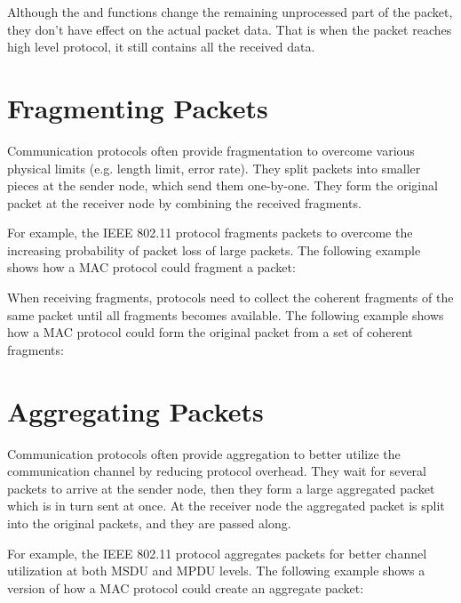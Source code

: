 
Although the  and  functions change the
remaining unprocessed part of the packet, they don't have effect on the actual
packet data. That is when the packet reaches high level protocol, it still
contains all the received data.

\section{Fragmenting Packets}

Communication protocols often provide fragmentation to overcome various physical
limits (e.g. length limit, error rate). They split packets into smaller pieces
at the sender node, which send them one-by-one. They form the original packet at
the receiver node by combining the received fragments.

For example, the IEEE 802.11 protocol fragments packets to overcome the
increasing probability of packet loss of large packets. The following example
shows how a MAC protocol could fragment a packet:


When receiving fragments, protocols need to collect the coherent fragments of
the same packet until all fragments becomes available. The following example
shows how a MAC protocol could form the original packet from a set of coherent
fragments:


\section{Aggregating Packets}

Communication protocols often provide aggregation to better utilize the
communication channel by reducing protocol overhead. They wait for several
packets to arrive at the sender node, then they form a large aggregated packet
which is in turn sent at once. At the receiver node the aggregated packet is
split into the original packets, and they are passed along.

For example, the IEEE 802.11 protocol aggregates packets for better channel
utilization at both MSDU and MPDU levels. The following example shows a version
of how a MAC protocol could create an aggregate packet:

